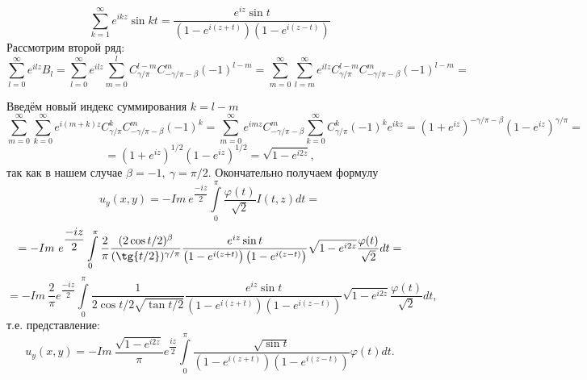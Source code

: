 \documentclass[a4paper, 9pt]{article}
\begin{document}
		\begin{equation*}
			\sum\limits_{k=1}^{\infty} e^{ikz}\sin{kt} =  \dfrac{e^{iz} \sin{t}}{\left(1 - e^{i(z+t)} \right) \left(1 - e^{i(z-t)}\right)}
		\end{equation*}
		Рассмотрим второй ряд:
		\begin{equation*}
			\sum\limits_{l =0 }^{\infty} e^{ilz} B_{l} = \sum\limits_{l =0 }^{\infty} e^{ilz} \sum\limits_{m=0}^{l} C^{l - m}_{\gamma/\pi} C^{m}_{-\gamma/\pi - \beta} (-1)^{l-m} = \sum\limits_{m=0}^{\infty} \sum\limits_{l=m}^{\infty} e^{ilz} C^{l - m}_{\gamma/\pi} C^{m}_{-\gamma/\pi - \beta} (-1)^{l-m} = 
		\end{equation*}
		\par
		Введём новый индекс суммирования $k = l -m$
		\begin{equation*}
			\sum\limits_{m=0}^{\infty} \sum\limits_{k=0}^{\infty} e^{i(m+k)z} C^{k}_{\gamma/\pi} C^{m}_{-\gamma/\pi - \beta} (-1)^{k} = \sum\limits_{m=0}^{\infty} e^{imz} C^{m}_{-\gamma/\pi - \beta} \sum\limits_{k=0}^{\infty}  C^{k}_{\gamma/\pi} (-1)^k e^{ikz} = (1 + e^{iz})^{-\gamma/\pi - \beta} (1- e^{iz})^{\gamma/\pi} =
		\end{equation*}
		\begin{equation*}
			= (1 + e^{iz})^{1/2} (1- e^{iz})^{1/2} =\sqrt{1 - e^{i2z}},
		\end{equation*}
		так как в нашем случае $\beta = -1, \ \gamma = \pi/2$.
		Окончательно получаем формулу
		\begin{equation*}
			u_y(x,y) = - Im\ e^{\dfrac{-iz}{2}} \int\limits_0^\pi \dfrac{\varphi(t)}{\sqrt2} I(t,z) dt =
		\end{equation*}
		\begin{equation*}
			 = - Im\ e^{\dfrac{-iz}{2}} \int\limits_0^\pi \dfrac{2}{\pi}\dfrac{(2\cos{t/2})^\beta}{(\tg{t/2})^{\gamma/\pi}}  \dfrac{e^{iz} \sin{t}}{\left(1 - e^{i(z+t)} \right) \left(1 - e^{i(z-t)}\right)} \sqrt{1 - e^{i2z}} \dfrac{\varphi(t)}{\sqrt2} dt =
		\end{equation*}
		\begin{equation*}
			 = - Im\  \dfrac{2}{\pi} e^{\dfrac{-iz}{2}} \int\limits_0^\pi \dfrac{1}{2\cos{t/2} \sqrt{\tan{t/2}}}  \dfrac{e^{iz} \sin{t}}{\left(1 - e^{i(z+t)} \right) \left(1 - e^{i(z-t)}\right)} \sqrt{1 - e^{i2z}} \dfrac{\varphi(t)}{\sqrt2} dt, 
		\end{equation*}
		т.е. представление:
		\begin{equation*}
			u_y(x,y) = - Im\  \dfrac{ \sqrt{1 - e^{i2z}} }{\pi} e^{\dfrac{iz}{2}}  \int\limits_0^\pi  \dfrac{\sqrt{\sin{t}} }{\left(1 - e^{i(z+t)} \right) \left(1 - e^{i(z-t)}\right)}  \varphi(t) dt.
		\end{equation*}
\end{document}
